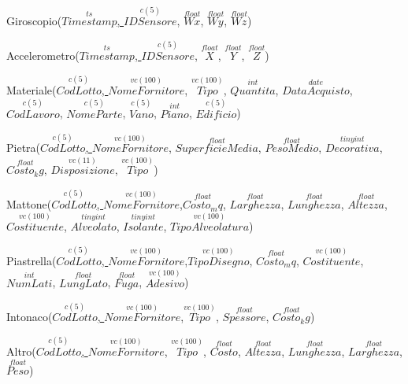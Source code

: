 \documentclass[12pt,a4paper]{report}
\begin{document}
\begin{flushleft}
\begin{footnotesize}
            Giroscopio(\underline{$\overset{ts}{Timestamp}$, $\overset{c(5)}{IDSensore}$}, $\overset{float}{Wx}$, $\overset{float}{Wy}$, $\overset{float}{Wz}$)
            \vspace{0.5cm}
            
            Accelerometro(\underline{$\overset{ts}{Timestamp}$, $\overset{c(5)}{IDSensore}$}, $\overset{float}{X}$, $\overset{float}{Y}$, $\overset{float}{Z}$)
            \vspace{0.5cm}
            
            Materiale(\underline{$\overset{c(5)}{CodLotto}$, $\overset{vc(100)}{NomeFornitore}$}, $\overset{vc(100)}{Tipo}$, $\overset{int}{Quantita}$, $\overset{date}{DataAcquisto}$, $\overset{c(5)}{CodLavoro}$, $\overset{c(5)}{NomeParte}$, $\overset{c(5)}{Vano}$, $\overset{int}{Piano}$, $\overset{c(5)}{Edificio}$)
            \vspace{0.5cm}
            
            Pietra(\underline{$\overset{c(5)}{CodLotto}$, $\overset{vc(100)}{NomeFornitore}$}, $\overset{float}{SuperficieMedia}$, $\overset{float}{PesoMedio}$, $\overset{tinyint}{Decorativa}$, $\overset{float}{Costo_kg}$, $\overset{vc(11)}{Disposizione}$, $\overset{vc(100)}{Tipo}$)
            \vspace{0.5cm}
            
            Mattone(\underline{$\overset{c(5)}{CodLotto}$, $\overset{vc(100)}{NomeFornitore}$},$\overset{float}{Costo_mq}$, $\overset{float}{Larghezza}$, $\overset{float}{Lunghezza}$, $\overset{float}{Altezza}$, $\overset{vc(100)}{Costituente}$, $\overset{tinyint}{Alveolato}$, $\overset{tinyint}{Isolante}$, $\overset{vc(100)}{TipoAlveolatura}$)
            \vspace{0.5cm}
            
            Piastrella(\underline{$\overset{c(5)}{CodLotto}$, $\overset{vc(100)}{NomeFornitore}$},$\overset{vc(100)}{TipoDisegno}$, $\overset{float}{Costo_mq}$, $\overset{vc(100)}{Costituente}$, $\overset{int}{NumLati}$, $\overset{float}{LungLato}$, $\overset{float}{Fuga}$, $\overset{vc(100)}{Adesivo}$)
            \vspace{0.5cm}
            
            Intonaco(\underline{$\overset{c(5)}{CodLotto}$, $\overset{vc(100)}{NomeFornitore}$},$\overset{vc(100)}{Tipo}$, $\overset{float}{Spessore}$, $\overset{float}{Costo_kg}$)
            \vspace{0.5cm}
            
            Altro(\underline{$\overset{c(5)}{CodLotto}$, $\overset{vc(100)}{NomeFornitore}$}, $\overset{vc(100)}{Tipo}$, $\overset{float}{Costo}$, $\overset{float}{Altezza}$, $\overset{float}{Lunghezza}$, $\overset{float}{Larghezza}$, $\overset{float}{Peso}$)
            \vspace{0.5cm}
            

\end{footnotesize}
\end{flushleft}
\end{document}
